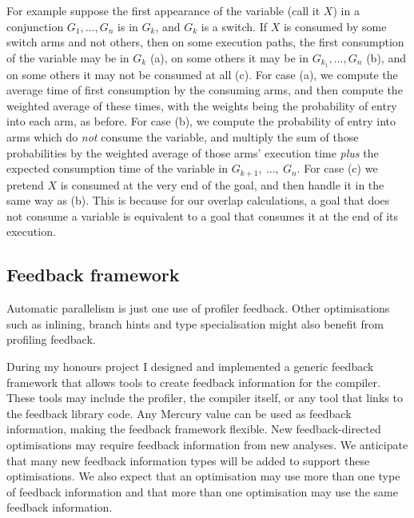 For example
suppose the first appearance of the variable (call it $X$)
in a conjunction $G_1, \ldots, G_n$ is in $G_k$, and $G_k$ is a switch.
If $X$ is consumed by some switch arms and not others,
then on some execution paths,
the first consumption of the variable may be in $G_k$ (a),
on some others it may be in $G_{k_1}, \ldots, G_n$ (b),
and on some others it may not be consumed at all (c).
For case (a),
we compute the average time of first consumption by the consuming arms,
and then compute the weighted average of these times,
with the weights being the probability of entry into each arm, as before.
For case (b), we compute the probability of entry
into arms which do \emph{not} consume the variable,
and multiply the sum of those probabilities
by the weighted average of those arms' execution time
\emph{plus} the expected consumption time of the variable
in $G_{k+1},~\ldots,~G_n$.
For case (c)
we pretend $X$ is consumed at the very end of the goal,
and then handle it in the same way as (b).
This is because for our overlap calculations,
a goal that does not consume a variable is equivalent to
a goal that consumes it at the end of its execution.

\subsection{Feedback framework}
\label{sec:feedback}

Automatic parallelism is just one use of profiler feedback.
Other optimisations
such as inlining,
branch hints
and type specialisation
might also benefit from profiling feedback.

During my honours project I designed and implemented a generic feedback
framework that allows tools to create feedback information for the compiler.
These tools may include the profiler, the compiler itself,
or any tool that links to the feedback library code.
Any Mercury value can be used as feedback information,
making the feedback framework flexible.
New feedback-directed optimisations may require feedback information
from new analyses.
We anticipate that many new feedback information types will be added to
support these optimisations.
We also expect that an optimisation may use more than one type of
feedback information and that more than one optimisation may use the
same feedback information.

